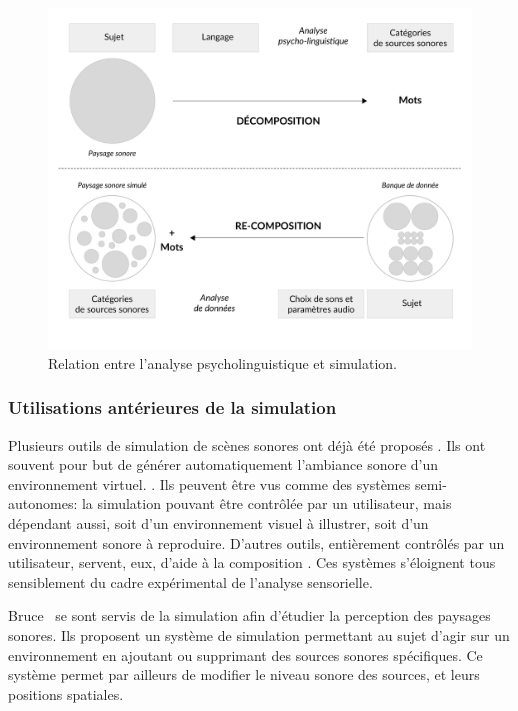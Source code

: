 \begin{figure}[t]
        \myfloatalign
        \includegraphics[width=.8\linewidth]{gfx/ch_4/1}
       \caption{Relation entre l'analyse psycholinguistique et simulation.}\label{fig:paradigmeSimu1}
\end{figure}
 
\subsubsection{Utilisations antérieures de la simulation}

Plusieurs outils de simulation de scènes sonores ont déjà été proposés \citep{misra2006new,misra2007musical,valle2009framework,finney2010soundscape,schirosa2010system}. Ils ont souvent pour but de générer automatiquement l'ambiance sonore d'un environnement virtuel. \citep{valle2009framework,finney2010soundscape}. Ils peuvent être vus comme des systèmes semi-autonomes: la simulation pouvant être contrôlée par un utilisateur, mais dépendant aussi, soit d'un environnement visuel à illustrer, soit d'un environnement sonore à reproduire. D'autres outils, entièrement contrôlés par un utilisateur, servent, eux, d'aide à la composition \citep{misra2006new,misra2007musical}. Ces systèmes s'éloignent tous sensiblement du cadre expérimental de l'analyse sensorielle.

Bruce~\al \citep{bruce2009development,bruce2014effects} se sont servis de la simulation afin d'étudier la perception des paysages sonores. Ils proposent un système de simulation permettant au sujet d'agir sur un environnement en ajoutant ou supprimant des sources sonores spécifiques. Ce système permet par ailleurs de modifier le niveau sonore des sources, et leurs positions spatiales.

